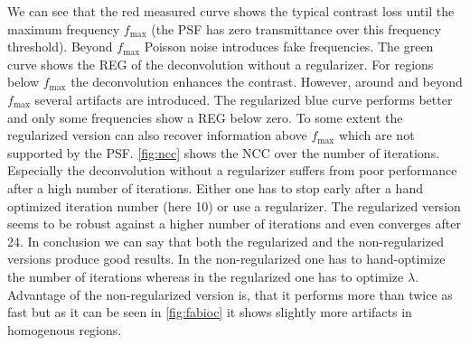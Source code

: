 \documentclass{juliacon}
\begin{document}
        We can see that the red measured curve shows the typical contrast loss until the maximum frequency $f_\textrm{max}$ (the PSF has
            zero transmittance over this frequency threshold).
        Beyond $f_\textrm{max}$ Poisson noise introduces fake frequencies.
        The green curve shows the REG of the deconvolution without a regularizer. 
        For regions below  $f_\textrm{max}$
        the deconvolution enhances the contrast. However, around and beyond $f_\textrm{max}$ several artifacts are introduced.
        The regularized blue curve performs better and only some frequencies show a REG below zero.
        To some extent the regularized version can also recover information above $f_\textrm{max}$ which are not supported by the PSF.
        \autoref{fig:ncc} shows the NCC over the number of iterations.
        Especially the deconvolution without a regularizer suffers from poor performance after a high number of iterations.
        Either one has to stop early after a hand optimized iteration number (here 10) or use a regularizer.
        The regularized version seems to be robust against a higher number of iterations and even converges after 24.
        In conclusion we can say that both the regularized and the non-regularized versions produce good results. 
        In the non-regularized one has to hand-optimize the number of iterations whereas in the regularized one has to optimize $\lambda$.
        Advantage of the non-regularized version is, that it performs more than twice as fast but as it can be seen in \autoref{fig:fabioc} 
        it shows slightly more artifacts in homogenous regions.
\end{document}
